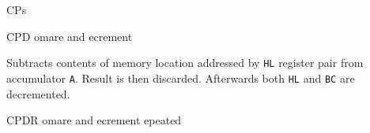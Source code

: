 \begin{basedescript}{
	\desclabelstyle{\multilinelabel}
	\desclabelwidth{3cm}}
\begin{DetailItem}{CP}{s}
	\end{DetailItem}

	\pagebreak


	\begin{DetailItem}{CPD}{}
		{omare and ecrement}
		{\SymCPD}

		Subtracts contents of memory location addressed by {\tt HL} register pair from accumulator {\tt A}. Result is then discarded. Afterwards both {\tt HL} and {\tt BC} are decremented.

		\begin{DetailEffects}
			\FlagsCPD
		\end{DetailEffects}

		\begin{DetailEffectsFlags}
		\end{DetailEffectsFlags}


		\begin{DetailTiming}
		\end{DetailTiming}

	\end{DetailItem}


	\begin{DetailItem}{CPDR}{}
		{omare and ecrement epeated}
		{\SymCPDR}


\end{DetailItem}
\end{basedescript}
